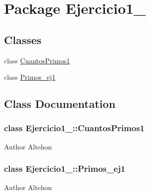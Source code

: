 \hypertarget{namespace_ejercicio1__1}{}\section{Package Ejercicio1\+\_}
\label{namespace_ejercicio1__1}
\subsection*{Classes}
\begin{DoxyCompactItemize}
\item 
class \mbox{\hyperlink{namespace_ejercicio1__1_class_ejercicio1__1_1_1_cuantos_primos1}{Cuantos\+Primos1}}
\item 
class \mbox{\hyperlink{namespace_ejercicio1__1_class_ejercicio1__1_1_1_primos__ej1}{Primos\+\_\+ej1}}
\end{DoxyCompactItemize}


\subsection{Class Documentation}
\label{class_ejercicio1__1_1_1_cuantos_primos1}
\subsubsection{class Ejercicio1\+\_\+:\+:Cuantos\+Primos1}
\begin{DoxyAuthor}{Author}
Altehon 
\end{DoxyAuthor}
\label{class_ejercicio1__1_1_1_primos__ej1}
\subsubsection{class Ejercicio1\+\_\+:\+:Primos\+\_\+ej1}
\begin{DoxyAuthor}{Author}
Altehon 
\end{DoxyAuthor}
